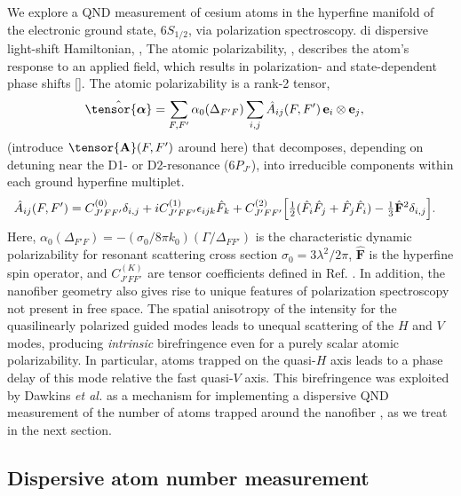 \documentclass[preprint,aps,pra,onecolumn]{revtex4-1} %
\newcommand{\poltens}{\hat{\tensor{\boldsymbol{\alpha}}}}
\newcommand{\charpol}{\alpha_0(\Delta_{F'F})}
\newcommand{\comment}[1]{{\color{Maroon} #1}}
\begin{document}
We explore a QND measurement of cesium atoms in the hyperfine manifold of the electronic ground state, $6S_{1/2}$, via polarization spectroscopy.  di dispersive light-shift Hamiltonian, , The atomic polarizability, , describes the atom's response to an applied field, which results in polarization- and state-dependent phase shifts [].  The atomic polarizability is a rank-2 tensor,
	\begin{align} \label{Eq::Polarizability}
		\poltens %
		&=  \sum_{F,F'} \charpol \sum_{i,j} \hat{A}_{ij}(F,F') \, \mathbf{e}_i \otimes \mathbf{e}_j,
	\end{align}
\comment{(introduce $\tensor{\mbf{A}}(F,F')$ around here)} that decomposes, depending on detuning near the D1- or D2-resonance ($6P_{J'}$), into irreducible components within each ground hyperfine multiplet.  
	\begin{align} \label{Eq::PolarizabilityIrrep}
		\hat{A}_{ij}(F,F')&=  C_{J'FF'}^{(0)} \delta_{i,j}+ iC_{J'FF'}^{(1)}\epsilon_{ijk}\hat{F}_k+ C_{J'FF'}^{(2)} \Big[ \mbox{$\frac{1}{2}$} ( \hat{F}_i\hat{F}_j +\hat{F}_j\hat{F}_i )-\mbox{$\frac{1}{3}$}\hat{\mathbf{F}}^2 \delta_{i,j} \Big]. 
\end{align}
Here, $\charpol = -(\sigma_0/8\pi k_0) (\Gamma/\Delta_{FF'})$ is the characteristic dynamic polarizability for resonant scattering cross section $\sigma_0 = 3 \lambda^2/2\pi$, $\hat{\mathbf{F}}$ is the hyperfine spin operator, and $C_{J'FF'}^{(K)}$ are tensor coefficients defined in Ref. \cite{deutsch_quantum_2010}.  In addition, the nanofiber geometry also gives rise to unique features of polarization spectroscopy not present in free space.  The spatial anisotropy of the intensity for the quasilinearly polarized guided modes leads to unequal scattering of the $H$ and $V$ modes, producing \emph{intrinsic} birefringence even for a purely scalar atomic polarizability.  In particular, atoms trapped on the quasi-$H$ axis leads to a phase delay of this mode relative the fast quasi-$V$ axis. This birefringence was exploited by Dawkins {\em et al.} as a mechanism for implementing a dispersive QND measurement of the number of atoms trapped around the nanofiber \cite{dawkins_dispersive_2011}, as we treat in the next section. 

	\subsection{Dispersive atom number measurement} \label{Sec::AtomNumberMeasurement}
\end{document}

